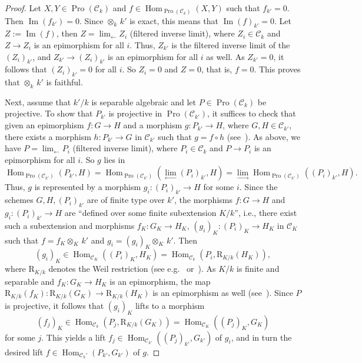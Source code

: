 \documentclass[11pt]{article}
\theoremstyle{definition}
\numberwithin{equation}{section}
\newcommand\cC{{\mathcal C}}
\newcommand\R{\mathrm{R}}
\DeclareMathOperator{\Hom}{Hom}
\DeclareMathOperator{\Pro}{Pro}
\DeclareMathOperator{\Imop}{Im}
\renewcommand\Im{{\Imop}}
\theoremstyle{remark}
\begin{document}
\begin{proof}
Let $X, Y \in \Pro(\cC_k)$ and $f \in \Hom_{\Pro(\cC_k)}(X,Y)$ such that $f_{k'} = 0$. Then $\Im(f_{k'}) = 0$. Since $\otimes_k \, k'$ is exact, this means that $\Im(f)_{k'} = 0$. Let $Z := \Im(f)$, then $Z = \lim_{\leftarrow} Z_i$ (filtered inverse limit), where $Z_i \in \cC_k$ and $Z \to Z_i$ is an epimorphism for all $i$. Thus, $Z_{k'}$ is the filtered inverse limit of the $(Z_i)_{k'}$, and $Z_{k'} \to (Z_i)_{k'}$ is an epimorphism for all $i$ as well. As $Z_{k'} = 0$, it follows that $(Z_i)_{k'} = 0$ for all $i$. So $Z_i = 0$ and $Z = 0$, that is, $f = 0$. This proves that $\otimes_k \, k'$ is faithful.

Next, assume that $k'/k$ is separable algebraic and let $P \in \Pro(\cC_k)$ be projective. To show that $P_{k'}$ is projective in $\Pro(\cC_{k'})$, it suffices to check that given an epimorphism $f: G \to H$ and a morphism $g : P_{k'} \to H$, where $G,H \in \cC_{k'}$, there exists a morphism $h : P_{k'} \to G$ in $\cC_{k'}$ such that $g = f \circ h$ (see~\cite[V.2.3.5]{DG}). As above, we have $P = \lim_{\leftarrow} P_i$ (filtered inverse limit), where $P_i \in \cC_k$ and $P \to P_i$ is an epimorphism for all $i$. So $g$ lies in
\[
\Hom_{\Pro(\cC_{k'})}(P_{k'}, H) = \Hom_{\Pro(\cC_{k'})}(\lim_{\leftarrow}(P_i)_{k'}, H) = \lim_{\to} \Hom_{\Pro(\cC_{k'})}((P_i)_{k'}, H).
\]
Thus, $g$ is represented by a morphism $g_i : (P_i)_{k'} \to H$ for some $i$. Since the schemes $G,H,(P_i)_{k'}$ are of finite type over $k'$, the morphisms $f: G \to H$ and $g_i : (P_i)_{k'} \to H$ are ``defined over some finite subextension $K/k$'', i.e., there exist such a subextension and morphisms $f_K : G_K \to H_K$, $(g_i)_K : (P_i)_K \to H_K$ in $\cC_K$ such that $f = f_K \otimes_K \, k'$ and $g_i = (g_i)_K \otimes_K \, k'$. Then
\[
(g_i)_K \in \Hom_{\cC_K}((P_i)_K, H_K) = \Hom_{\cC_k}(P_i, \R_{K/k}(H_K)),
\]
where $\R_{K/k}$ denotes the Weil restriction (see e.g.~\cite[I.1.6.6]{DG} or~\cite[App.~B]{CGP}). As $K/k$ is finite and separable and $f_K : G_K \to H_K$ is an epimorphism, the map $\R_{K/k}(f_K) : \R_{K/k}(G_K) \to \R_{K/k}(H_K)$ is an epimorphism as well (see~\cite[III.5.7.9]{DG}). Since $P$ is projective, it follows that $(g_i)_K$ lifts to a morphism
\[
(f_j)_K \in \Hom_{\cC_k}(P_j, \R_{K/k}(G_K)) = \Hom_{\cC_K}((P_j)_K, G_K)
\]
for some $j$. This yields a lift $f_j \in \Hom_{\cC_{k'}}((P_j)_{k'}, G_{k'})$ of $g_i$, and in turn the desired lift $f \in \Hom_{\cC_k'}(P_{k'}, G_{k'})$ of $g$.
\end{proof}
\end{document}
